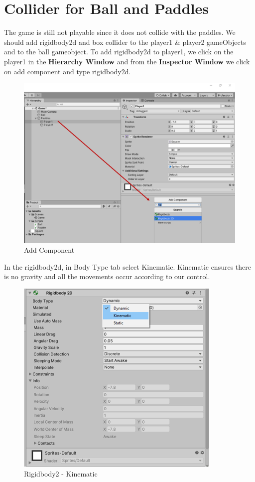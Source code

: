 \documentclass[
]{book}
\begin{document}
\hypertarget{collider-for-ball-and-paddles}{%
\section{Collider for Ball and Paddles}\label{collider-for-ball-and-paddles}}

The game is still not playable since it does not collide with the paddles. We should add rigidbody2d and box collider to the player1 \& player2 gameObjects and to the ball gameobject. To add rigidbody2d to player1, we click on the player1 in the \textbf{Hierarchy Window} and from the \textbf{Inspector Window} we click on add component and type rigidbody2d.

\begin{figure}
\centering
\includegraphics{Images/AddComponent.png}
\caption{Add Component}
\end{figure}

In the rigidbody2d, in Body Type tab select Kinematic. Kinematic ensures there is no gravity and all the movements occur according to our control.

\begin{figure}
\centering
\includegraphics{Images/Rigidbody2d.png}
\caption{Rigidbody2 - Kinematic}
\end{figure}
\end{document}
